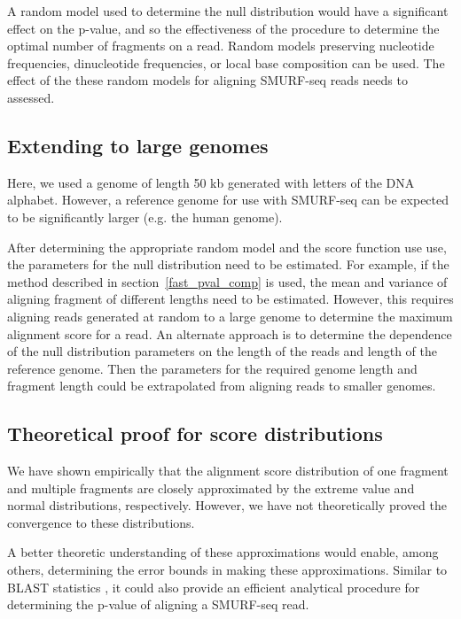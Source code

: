 A random model used to determine the null distribution would have a
significant effect on the p-value, and so the effectiveness of the
procedure to determine the optimal number of fragments on a read. Random
models preserving nucleotide frequencies, dinucleotide frequencies, or
local base composition can be used.  The effect of the these random
models for aligning SMURF-seq reads needs to assessed.

\subsection*{Extending to large genomes}
Here, we used a genome of length 50 kb generated with letters of the DNA
alphabet. However, a reference genome for use with SMURF-seq can be
expected to be significantly larger (e.g. the human genome).

After determining the appropriate random model and the score function
use use, the parameters for the null distribution need to be estimated.
For example, if the method described in section~\ref{fast_pval_comp} is
used, the mean and variance of aligning fragment of different lengths
need to be estimated.
%
However, this requires aligning reads generated at random to a large
genome to determine the maximum alignment score for a read.
%
An alternate approach is to determine the dependence of the null
distribution parameters on the length of the reads and length of the
reference genome. Then the parameters for the required genome length and
fragment length could be extrapolated from aligning reads to smaller
genomes.

\subsection*{Theoretical proof for score distributions}
We have shown empirically that the alignment score distribution of one
fragment and multiple fragments are closely approximated by the extreme
value and normal distributions, respectively. However, we have not
theoretically proved the convergence to these distributions.

A better theoretic understanding of these approximations would enable,
among others, determining the error bounds in making these
approximations.
%
Similar to BLAST statistics
\citep{karlin1990methods,karlin1990statistical}, it could also provide
an efficient analytical procedure for determining the p-value of
aligning a SMURF-seq read.

